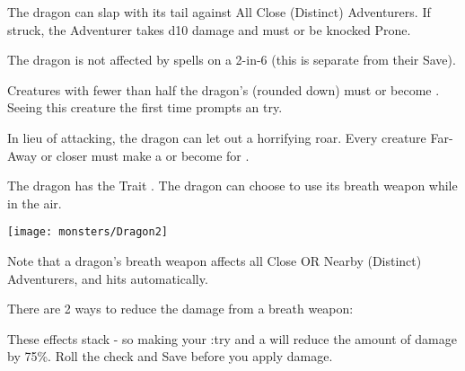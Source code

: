 \begin{multicols}{2}
 The dragon can slap with its tail against All Close (Distinct) Adventurers.  If struck, the Adventurer takes d10 damage and must \RSTRY{\DEX} or be knocked Prone.


   The dragon is not affected by spells on a 2-in-6 (this is separate from their Save).


   Creatures with fewer than half the dragon's \HD (rounded down) must  or become .  Seeing this creature the first time prompts an \INSANITY try.


  In lieu of attacking, the dragon can let out a horrifying roar.  Every creature Far-Away or closer must make a  or become  for .
 

  The dragon has the Trait . The dragon can choose to use its breath weapon while in the air.

\begin{center}
\texttt{[image: monsters/Dragon2]}
\end{center}

\begin{multicols*}{2}



Note that a dragon's breath weapon affects all Close OR Nearby (Distinct) Adventurers, and hits automatically. 

There are 2 ways to reduce the damage from a breath weapon:

These effects stack - so making your \RS:\TAL try and a  will reduce the amount of damage by 75\%. Roll the check and Save before you apply damage.


\end{multicols*}
\end{multicols}
